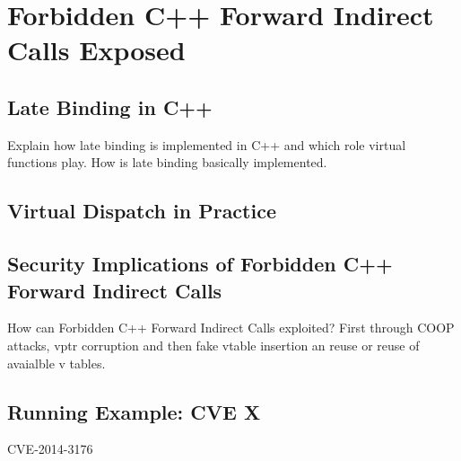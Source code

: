 \chapter{Forbidden C++ Forward Indirect Calls Exposed}
\label{C++ Bad Forward Indirect Calls}


\section{Late Binding in C++}
\label{Late Binding in C++}
Explain how late binding is implemented in C++ and which role virtual functions play.
How is late binding basically implemented.

\section{Virtual Dispatch in Practice}
\label{Virtual Dispatch in Practice}

\section{Security Implications of Forbidden C++ Forward Indirect Calls}
\label{Security Implications of Virtual Dispatch}

How can Forbidden C++ Forward Indirect Calls exploited?
First through COOP attacks,
vptr corruption and then fake vtable insertion an reuse
or reuse of avaialble v tables.

\section{Running Example: CVE X}
\label{Running Example: CVE X}
CVE-2014-3176